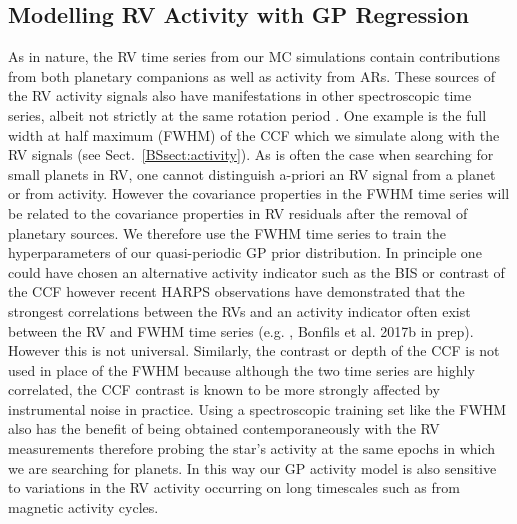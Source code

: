 \subsection{Modelling RV Activity with GP Regression} \label{BSsect:regression}
As in nature, the RV time series from our MC simulations contain contributions from both planetary companions
as well as activity from ARs. These sources of the RV activity signals also have manifestations in other
spectroscopic time series, albeit not strictly at the same rotation period \citep{hebrard16}. One example is the
full width at half maximum (FWHM) of the CCF which we simulate along with the RV signals (see Sect.~\ref{BSsect:activity}).
As is often the case when searching for small planets
in RV, one cannot distinguish a-priori an RV signal from a planet or from activity. However the covariance
properties in the FWHM time series will be related to the covariance properties in RV residuals after the removal
of planetary sources. We therefore use the FWHM time series to train the hyperparameters of our quasi-periodic
GP prior distribution. In principle one could have chosen an alternative activity indicator such as the BIS or
contrast of the CCF however recent HARPS observations have demonstrated that the strongest correlations between the RVs and
an activity indicator often exist between the RV and FWHM time series 
(e.g. \citealt{astudillodefru17a}, Bonfils et al. 2017b in prep). However
this is not universal. Similarly, the contrast or depth of the CCF is not used in place
of the FWHM because although the two time series are highly correlated, the CCF contrast is known to be more strongly
affected by instrumental noise in practice.
Using a spectroscopic training set like the FWHM also has the benefit of being obtained contemporaneously with the
RV measurements therefore probing the star's activity at the same epochs in which we are searching for planets.
In this way our GP activity model is also sensitive to variations in the RV activity occurring on long timescales such as
from magnetic activity cycles. \\


